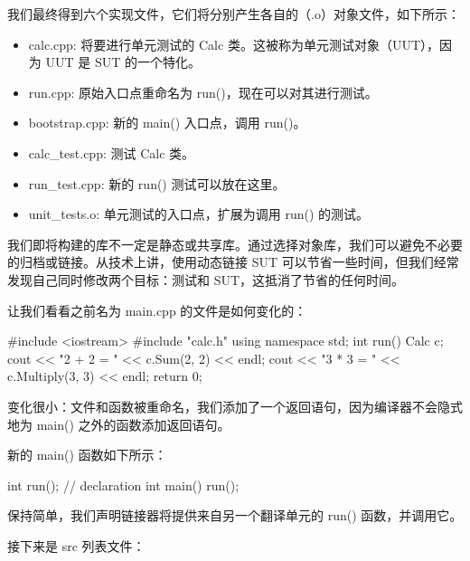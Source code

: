 我们最终得到六个实现文件，它们将分别产生各自的（.o）对象文件，如下所示：

\begin{itemize}
\item
calc.cpp: 将要进行单元测试的 Calc 类。这被称为单元测试对象（UUT），因为 UUT 是 SUT 的一个特化。

\item
run.cpp: 原始入口点重命名为 run()，现在可以对其进行测试。

\item
bootstrap.cpp: 新的 main() 入口点，调用 run()。

\item
calc\_test.cpp: 测试 Calc 类。

\item
run\_test.cpp: 新的 run() 测试可以放在这里。

\item
unit\_tests.o: 单元测试的入口点，扩展为调用 run() 的测试。
\end{itemize}

我们即将构建的库不一定是静态或共享库。通过选择对象库，我们可以避免不必要的归档或链接。从技术上讲，使用动态链接 SUT 可以节省一些时间，但我们经常发现自己同时修改两个目标：测试和 SUT，这抵消了节省的任何时间。

让我们看看之前名为 main.cpp 的文件是如何变化的：


\begin{cpp}
#include <iostream>
#include "calc.h"
using namespace std;
int run() {
    Calc c;
    cout << "2 + 2 = " << c.Sum(2, 2) << endl;
    cout << "3 * 3 = " << c.Multiply(3, 3) << endl;
    return 0;
}
\end{cpp}

变化很小：文件和函数被重命名，我们添加了一个返回语句，因为编译器不会隐式地为 main() 之外的函数添加返回语句。

新的 main() 函数如下所示：


\begin{cpp}
int run(); // declaration
int main() {
    run();
}
\end{cpp}

保持简单，我们声明链接器将提供来自另一个翻译单元的 run() 函数，并调用它。

接下来是 src 列表文件：


